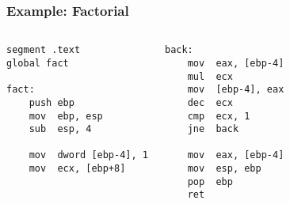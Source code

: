 \documentclass[dvipsnames]{beamer}
\begin{document}
\begin{frame}[fragile]
  \frametitle{Example: Factorial}

  \begin{columns}[t]
    \begin{lstlisting}
segment .text
global fact

fact:
    push ebp
    mov  ebp, esp
    sub  esp, 4

    mov  dword [ebp-4], 1
    mov  ecx, [ebp+8]
    \end{lstlisting}

    \begin{lstlisting}
back:
    mov  eax, [ebp-4]
    mul  ecx
    mov  [ebp-4], eax
    dec  ecx
    cmp  ecx, 1
    jne  back

    mov  eax, [ebp-4]
    mov  esp, ebp
    pop  ebp
    ret
    \end{lstlisting}
  \end{columns}
\end{frame}

%
%
%
%
%
%
%
%
\end{document}
